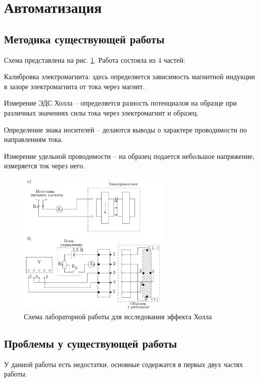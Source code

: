 \documentclass[a4paper,12pt]{article} %
\begin{document}
\section{Автоматизация}

\subsection*{Методика существующей работы}
Схема представлена на рис. \ref{старая}. 
Работа состояла из 4 частей: 

Калибровка электромагнита: здесь определяется зависимость магнитной индукции в зазоре электромагнита от тока через магнит. 

Измерение ЭДС Холла – определяется разность потенциалов на образце при различных значениях силы тока через электромагнит и образец. 

Определение знака носителей – делаются выводы о характере проводимости по направлениям тока. 

Измерение удельной проводимости – на образец подается небольшое напряжение, измеряется ток через него.
\begin{figure}[h!]
\begin{center}
\includegraphics[width=0.66\textwidth]{Схема_ст}
\caption{Схема лабораторной работы для исследования эффекта Холла} \label{старая}
\end{center}
\end{figure}


\subsection*{Проблемы у существующей работы}
У данной работы есть недостатки, основные содержатся в первых двух частях работы. 
\end{document}
